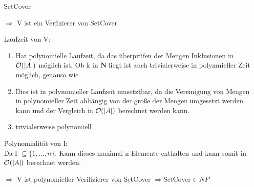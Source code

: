 \documentclass[answers]{submit}
\begin{document}
\begin{exercise}[6]{\textup{SetCover}}
{    $\Rightarrow$ V ist ein Verfizierer von SetCover

    Laufzeit von V:
    \begin{enumerate}
      \item Hat polynomielle Laufzeit, da das überprüfen der Mengen Inklusionen in $\mathcal{O}(\lvert A \rvert)$ möglich ist. Ob k in $\mathbf{N}$ liegt ist auch trivialerweise in polynmieller Zeit möglich, genauso wie
      \item Dies ist in polynomieller Laufzeit umsetztbar, da die Vereinigung von Mengen in polynomieller Zeit abhängig von der große der Mengen umgesetzt werden kann und der Vergleich in $\mathcal{O}(\lvert A \rvert)$ berechnet werden kann.
      \item trivialerweise polynomiell
    \end{enumerate}
    Polynomialität von I:\\
    Da I $\subseteq \{1, \dots, n \}$. Kann dieses maximal n Elemente enthalten und kann somit in $\mathcal{O}(\lvert A \rvert)$ berechnet werden.

    $\Rightarrow$ V ist polynomieller Verifizierer von SetCover $\Rightarrow \text{SetCover} \in NP$
  }
\end{exercise}
\end{document}
